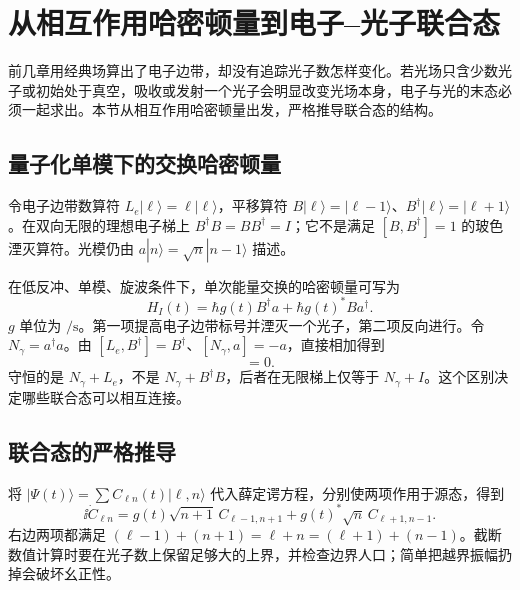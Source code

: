 \section{从相互作用哈密顿量到电子--光子联合态}
\label{chap:feqo-quantum-pinem}

前几章用经典场算出了电子边带，却没有追踪光子数怎样变化。若光场只含少数光子或初始处于真空，吸收或发射一个光子会明显改变光场本身，电子与光的末态必须一起求出。本节从相互作用哈密顿量出发，严格推导联合态的结构。

\subsection{量子化单模下的交换哈密顿量}

令电子边带数算符 \(L_e|\ell\rangle=\ell|\ell\rangle\)，平移算符 \(B|\ell\rangle=|\ell-1\rangle\)、\(B^\dagger|\ell\rangle=|\ell+1\rangle\)。在双向无限的理想电子梯上 \(B^\dagger B=BB^\dagger=I\)；它不是满足 \([B,B^\dagger]=1\) 的玻色湮灭算符。光模仍由 \(a|n\rangle=\sqrt n|n-1\rangle\) 描述。

在低反冲、单模、旋波条件下，单次能量交换的哈密顿量可写为
\begin{equation}
H_I(t)=\hbar g(t)B^\dagger a+\hbar g(t)^*B a^\dagger.
\label{eq:feqo-quantum-pinem-hamiltonian}
\end{equation}
\(g\) 单位为 \(\si{\per\second}\)。第一项提高电子边带标号并湮灭一个光子，第二项反向进行。令 \(N_\gamma=a^\dagger a\)。由 \([L_e,B^\dagger]=B^\dagger\)、\([N_\gamma,a]=-a\)，直接相加得到
\begin{equation}
[H_I,N_\gamma+L_e]=0.
\label{eq:feqo-exchange-conservation}
\end{equation}
守恒的是 \(N_\gamma+L_e\)，不是 \(N_\gamma+B^\dagger B\)，后者在无限梯上仅等于 \(N_\gamma+I\)。这个区别决定哪些联合态可以相互连接。

\subsection{联合态的严格推导}

将 \(|\Psi(t)\rangle=\sum C_{\ell n}(t)|\ell,n\rangle\) 代入薛定谔方程，分别使两项作用于源态，得到
\begin{equation}
\ii\dot C_{\ell n}=g(t)\sqrt{n+1}\,C_{\ell-1,n+1}
+g(t)^*\sqrt n\,C_{\ell+1,n-1}.
\label{eq:feqo-quantum-pinem-recursion}
\end{equation}
右边两项都满足 \((\ell-1)+(n+1)=\ell+n=(\ell+1)+(n-1)\)。截断数值计算时要在光子数上保留足够大的上界，并检查边界人口；简单把越界振幅扔掉会破坏幺正性。

